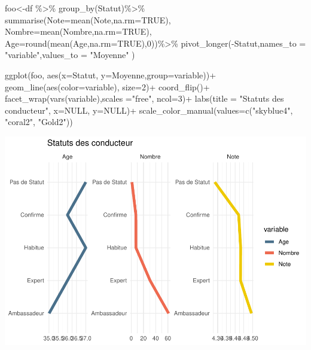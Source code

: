 \documentclass[
]{book}
\newenvironment{Shaded}{\begin{snugshade}}{\end{snugshade}}
\newcommand{\AttributeTok}[1]{\textcolor[rgb]{0.77,0.63,0.00}{#1}}
\newcommand{\ConstantTok}[1]{\textcolor[rgb]{0.00,0.00,0.00}{#1}}
\newcommand{\DecValTok}[1]{\textcolor[rgb]{0.00,0.00,0.81}{#1}}
\newcommand{\FunctionTok}[1]{\textcolor[rgb]{0.00,0.00,0.00}{#1}}
\newcommand{\NormalTok}[1]{#1}
\newcommand{\OtherTok}[1]{\textcolor[rgb]{0.56,0.35,0.01}{#1}}
\newcommand{\SpecialCharTok}[1]{\textcolor[rgb]{0.00,0.00,0.00}{#1}}
\newcommand{\StringTok}[1]{\textcolor[rgb]{0.31,0.60,0.02}{#1}}
\begin{document}
\begin{Shaded}
\begin{Highlighting}[]
\NormalTok{foo}\OtherTok{\textless{}{-}}\NormalTok{df }\SpecialCharTok{\%\textgreater{}\%} 
  \FunctionTok{group\_by}\NormalTok{(Statut)}\SpecialCharTok{\%\textgreater{}\%}
  \FunctionTok{summarise}\NormalTok{(}\AttributeTok{Note=}\FunctionTok{mean}\NormalTok{(Note,}\AttributeTok{na.rm=}\ConstantTok{TRUE}\NormalTok{),}
            \AttributeTok{Nombre=}\FunctionTok{mean}\NormalTok{(Nombre,}\AttributeTok{na.rm=}\ConstantTok{TRUE}\NormalTok{),}
            \AttributeTok{Age=}\FunctionTok{round}\NormalTok{(}\FunctionTok{mean}\NormalTok{(Age,}\AttributeTok{na.rm=}\ConstantTok{TRUE}\NormalTok{),}\DecValTok{0}\NormalTok{))}\SpecialCharTok{\%\textgreater{}\%}
  \FunctionTok{pivot\_longer}\NormalTok{(}\SpecialCharTok{{-}}\NormalTok{Statut,}\AttributeTok{names\_to =} \StringTok{"variable"}\NormalTok{,}\AttributeTok{values\_to =} \StringTok{"Moyenne"}\NormalTok{ )}


\FunctionTok{ggplot}\NormalTok{(foo, }\FunctionTok{aes}\NormalTok{(}\AttributeTok{x=}\NormalTok{Statut, }\AttributeTok{y=}\NormalTok{Moyenne,}\AttributeTok{group=}\NormalTok{variable))}\SpecialCharTok{+}
  \FunctionTok{geom\_line}\NormalTok{(}\FunctionTok{aes}\NormalTok{(}\AttributeTok{color=}\NormalTok{variable), }\AttributeTok{size=}\DecValTok{2}\NormalTok{)}\SpecialCharTok{+}
  \FunctionTok{coord\_flip}\NormalTok{()}\SpecialCharTok{+}
  \FunctionTok{facet\_wrap}\NormalTok{(}\FunctionTok{vars}\NormalTok{(variable),}\AttributeTok{scales =}\StringTok{"free"}\NormalTok{, }\AttributeTok{ncol=}\DecValTok{3}\NormalTok{)}\SpecialCharTok{+}  
  \FunctionTok{labs}\NormalTok{(}\AttributeTok{title =} \StringTok{"Statuts des conducteur"}\NormalTok{, }\AttributeTok{x=}\ConstantTok{NULL}\NormalTok{, }\AttributeTok{y=}\ConstantTok{NULL}\NormalTok{)}\SpecialCharTok{+}
  \FunctionTok{scale\_color\_manual}\NormalTok{(}\AttributeTok{values=}\FunctionTok{c}\NormalTok{(}\StringTok{"skyblue4"}\NormalTok{, }\StringTok{"coral2"}\NormalTok{, }\StringTok{"Gold2"}\NormalTok{))}
\end{Highlighting}
\end{Shaded}

\includegraphics{bookdown-demo_files/figure-latex/0905-1.pdf}
\end{document}

